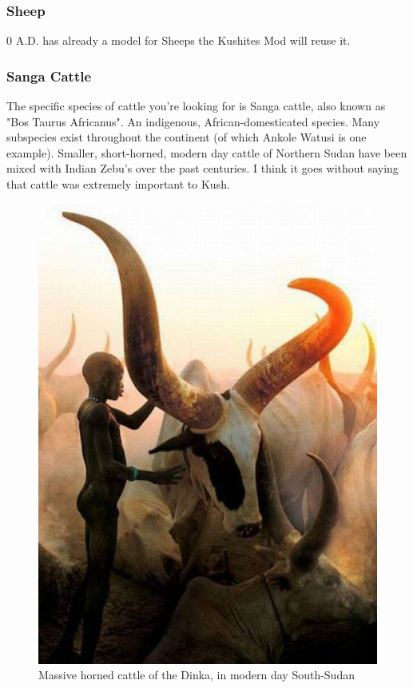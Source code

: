 \documentclass[a4paper,12pt]{scrreprt}
\begin{document}
\subsubsection{Sheep}

0 A.D. has already a model for Sheeps the Kushites Mod will reuse it.

\subsubsection{Sanga Cattle}

The specific species of cattle you're looking for is Sanga cattle, also known as "Bos Taurus Africanus". An indigenous, African-domesticated species. Many subspecies exist throughout the continent (of which Ankole Watusi is one example). Smaller, short-horned, modern day cattle of Northern Sudan have been mixed with Indian Zebu's over the past centuries. I think it goes without saying that cattle was extremely important to Kush.\\

\begin{figure}[H]
	\centering
	\includegraphics[width=\textwidth]{img/corral/sanga_cattle_dinka}
	\caption{Massive horned cattle of the Dinka, in modern day South-Sudan}
\end{figure}
\end{document}
